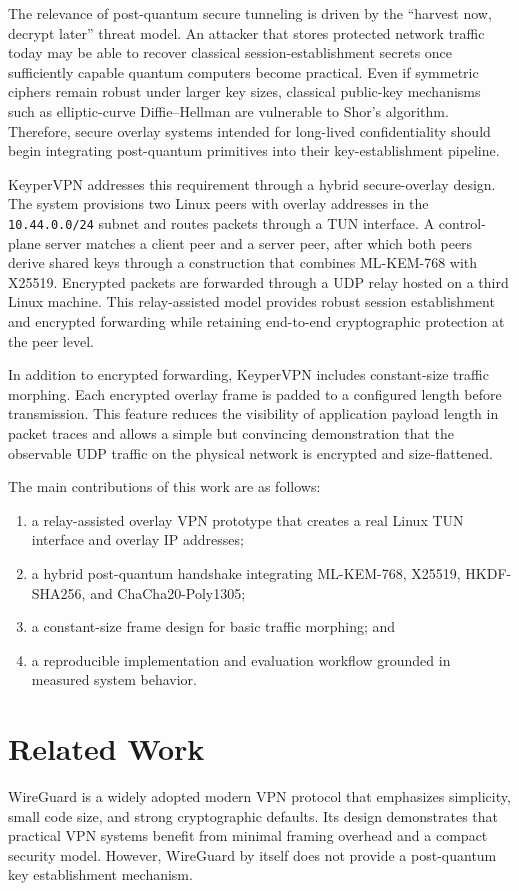 \documentclass[conference]{IEEEtran}
\begin{document}
The relevance of post-quantum secure tunneling is driven by the ``harvest now, decrypt later'' threat model. An attacker that stores protected network traffic today may be able to recover classical session-establishment secrets once sufficiently capable quantum computers become practical. Even if symmetric ciphers remain robust under larger key sizes, classical public-key mechanisms such as elliptic-curve Diffie--Hellman are vulnerable to Shor's algorithm. Therefore, secure overlay systems intended for long-lived confidentiality should begin integrating post-quantum primitives into their key-establishment pipeline.

KeyperVPN addresses this requirement through a hybrid secure-overlay design. The system provisions two Linux peers with overlay addresses in the \texttt{10.44.0.0/24} subnet and routes packets through a TUN interface. A control-plane server matches a client peer and a server peer, after which both peers derive shared keys through a construction that combines ML-KEM-768 with X25519. Encrypted packets are forwarded through a UDP relay hosted on a third Linux machine. This relay-assisted model provides robust session establishment and encrypted forwarding while retaining end-to-end cryptographic protection at the peer level.

In addition to encrypted forwarding, KeyperVPN includes constant-size traffic morphing. Each encrypted overlay frame is padded to a configured length before transmission. This feature reduces the visibility of application payload length in packet traces and allows a simple but convincing demonstration that the observable UDP traffic on the physical network is encrypted and size-flattened.

The main contributions of this work are as follows:
\begin{enumerate}[leftmargin=*,itemsep=0pt,topsep=2pt]
\item a relay-assisted overlay VPN prototype that creates a real Linux TUN interface and overlay IP addresses;
\item a hybrid post-quantum handshake integrating ML-KEM-768, X25519, HKDF-SHA256, and ChaCha20-Poly1305;
\item a constant-size frame design for basic traffic morphing; and
\item a reproducible implementation and evaluation workflow grounded in measured system behavior.
\end{enumerate}

\section{Related Work}
WireGuard is a widely adopted modern VPN protocol that emphasizes simplicity, small code size, and strong cryptographic defaults. Its design demonstrates that practical VPN systems benefit from minimal framing overhead and a compact security model. However, WireGuard by itself does not provide a post-quantum key establishment mechanism.
\end{document}
